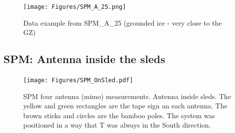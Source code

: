 \documentclass[a4paper,12pt]{article}
\begin{document}
\begin{figure}[H]
	\texttt{[image: Figures/SPM\_A\_25.png]}
	\caption{Data example from SPM\_A\_25 (grounded ice - very close to the GZ)}
	\label{fig_SPM_A_25}
\end{figure}

\subsection{SPM: Antenna inside the sleds}
\begin{figure}[H]
	\texttt{[image: Figures/SPM\_OnSled.pdf]}
	\caption{SPM four antenna (mimo) measurements. Antenna inside sleds.
  The yellow and green rectangles are the tape sign an each antenna. 
  The brown sticks and circles are the bamboo poles. 
  The system was positioned in a way that T was always in the South direction.}
	\label{fig_SPM_sled}
\end{figure}
\end{document}
